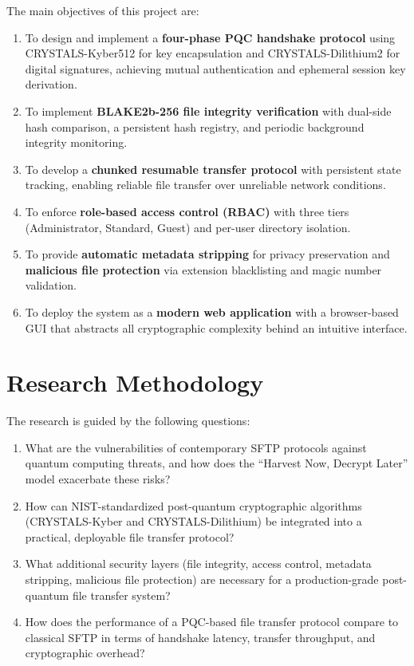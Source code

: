 The main objectives of this project are:
\begin{enumerate}
    \item To design and implement a \textbf{four-phase PQC handshake protocol} using CRYSTALS-Kyber512 for key encapsulation and CRYSTALS-Dilithium2 for digital signatures, achieving mutual authentication and ephemeral session key derivation.
    
    \item To implement \textbf{BLAKE2b-256 file integrity verification} with dual-side hash comparison, a persistent hash registry, and periodic background integrity monitoring.
    
    \item To develop a \textbf{chunked resumable transfer protocol} with persistent state tracking, enabling reliable file transfer over unreliable network conditions.
    
    \item To enforce \textbf{role-based access control (RBAC)} with three tiers (Administrator, Standard, Guest) and per-user directory isolation.
    
    \item To provide \textbf{automatic metadata stripping} for privacy preservation and \textbf{malicious file protection} via extension blacklisting and magic number validation.
    
    \item To deploy the system as a \textbf{modern web application} with a browser-based GUI that abstracts all cryptographic complexity behind an intuitive interface.
\end{enumerate}


\section{Research Methodology}

The research is guided by the following questions:
\begin{enumerate}
    \item What are the vulnerabilities of contemporary SFTP protocols against quantum computing threats, and how does the ``Harvest Now, Decrypt Later'' model exacerbate these risks?
    
    \item How can NIST-standardized post-quantum cryptographic algorithms (CRYSTALS-Kyber and CRYSTALS-Dilithium) be integrated into a practical, deployable file transfer protocol?
    
    \item What additional security layers (file integrity, access control, metadata stripping, malicious file protection) are necessary for a production-grade post-quantum file transfer system?
    
    \item How does the performance of a PQC-based file transfer protocol compare to classical SFTP in terms of handshake latency, transfer throughput, and cryptographic overhead?
\end{enumerate}

